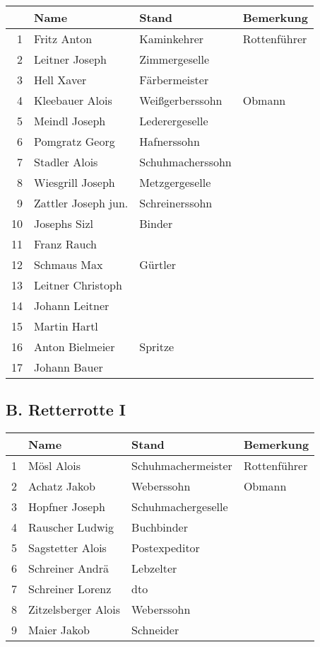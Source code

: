 \documentclass[12pt,a4paper]{book}
\begin{document}
\begin{tabular}{rlll}
& Name & Stand & Bemerkung\\
\hline
1 & Fritz Anton & Kaminkehrer & Rottenführer\\
2 & Leitner Joseph & Zimmergeselle\\
3 & Hell Xaver & Färbermeister\\
4 & Kleebauer Alois & Weißgerberssohn & Obmann\\
5 & Meindl Joseph & Lederergeselle\\
6 & Pomgratz Georg & Hafnerssohn\\
7 & Stadler Alois & Schuhmacherssohn\\
8 & Wiesgrill Joseph & Metzgergeselle\\
9 & Zattler Joseph jun. & Schreinerssohn\\
10 & Josephs Sizl & Binder\\
11 & Franz Rauch\\
12 & Schmaus Max & Gürtler\\
13 & Leitner Christoph\\
14 & Johann Leitner\\
15 & Martin Hartl\\
16 & Anton Bielmeier & Spritze\\
17 & Johann Bauer\\
\end{tabular}

\subsection*{B. Retterrotte I}

\begin{tabular}{rlll}
& Name & Stand & Bemerkung\\
\hline
1 & Mösl Alois & Schuhmachermeister & Rottenführer\\
2 & Achatz Jakob & Weberssohn & Obmann\\
3 & Hopfner Joseph & Schuhmachergeselle\\
4 & Rauscher Ludwig & Buchbinder\\
5 & Sagstetter Alois & Postexpeditor\\
6 & Schreiner Andrä & Lebzelter\\
7 & Schreiner Lorenz & dto\\
8 & Zitzelsberger Alois & Weberssohn\\
9 & Maier Jakob & Schneider\\
\end{tabular}
\end{document}
